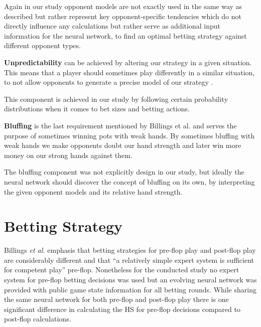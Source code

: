 Again in our study opponent models are not exactly used in the same way as described but rather represent key opponent-specific tendencies which do not directly influence any calculations but rather serve as additional input information for the neural network, to find an optimal betting strategy against different opponent types. \par
\textbf{Unpredictability} can be achieved by altering our strategy in a given situation. This means that a player should sometimes play differently in a similar situation, to not allow opponents to generate a precise model of our strategy \cite{challenge_of_poker}. \par
This component is achieved in our study by following certain probability distributions when it comes to bet sizes and betting actions.  \par
\textbf{Bluffing} is the last requirement mentioned by Billings et al. \cite{challenge_of_poker} and serves the purpose of sometimes winning pots with weak hands. By sometimes bluffing with weak hands we make opponents doubt our hand strength and later win more money on our strong hands against them. \par
The bluffing component was not explicitly design in our study, but ideally the neural network should discover the concept of bluffing on its own, by interpreting the given opponent models and its relative hand strength.
\section{Betting Strategy}
Billings \textit{et al.} \cite[p.~210]{challenge_of_poker} emphasis that betting strategies for pre-flop play and post-flop play are considerably different and that \enquote{a relatively simple expert system is sufficient for competent play} pre-flop. Nonetheless for the conducted study no expert system for pre-flop betting decisions was used but an evolving neural network was provided with public game state information for all betting rounds. While sharing the same neural network for both pre-flop and post-flop play there is one significant difference in calculating the HS for pre-flop decisions compared to post-flop calculations.
